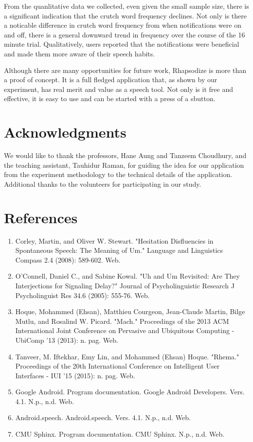\documentclass{sigchi}
\begin{document}
From the quanlitative data we collected, even given the small sample size, there is a significant indication that the crutch word frequency declines. Not only is there a noticable difference in crutch word frequency from when notifications were on and off, there is a general downward trend in frequency over the course of the 16 minute trial. Qualitatively, users reported that the notifications were beneficial and made them more aware of their speech habits. 

Although there are many opportunities for future work, Rhapsodize is more than a proof of concept. It is a full fledged application that, as shown by our experiment, has real merit and value as a speech tool. Not only is it free and effective, it is easy to use and can be started with a press of a sbutton. 

\section{Acknowledgments}

We would like to thank the professors, Hane Aung and Tanzeem Choudhury, and the teaching assistant, Tauhidur Raman, for guiding the idea for our application from the experiment methodology to the technical details of the application. Additional thanks to the volunteers for participating in our study. 

\section{References}

\begin{enumerate}
\item Corley, Martin, and Oliver W. Stewart. "Hesitation Disfluencies in Spontaneous Speech: The Meaning of Um." Language and Linguistics Compass 2.4 (2008): 589-602. Web.
\item O’Connell, Daniel C., and Sabine Kowal. "Uh and Um Revisited: Are They Interjections for Signaling Delay?" Journal of Psycholinguistic Research J Psycholinguist Res 34.6 (2005): 555-76. Web.
\item Hoque, Mohammed (Ehsan), Matthieu Courgeon, Jean-Claude Martin, Bilge Mutlu, and Rosalind W. Picard. "Mach." Proceedings of the 2013 ACM International Joint Conference on Pervasive and Ubiquitous Computing - UbiComp '13 (2013): n. pag. Web.
\item Tanveer, M. Iftekhar, Emy Lin, and Mohammed (Ehsan) Hoque. "Rhema." Proceedings of the 20th International Conference on Intelligent User Interfaces - IUI '15 (2015): n. pag. Web.
\item Google Android. Program documentation. Google Android Developers. Vers. 4.1. N.p., n.d. Web.
\item Android.speech. Android.speech. Vers. 4.1. N.p., n.d. Web.
\item CMU Sphinx. Program documentation. CMU Sphinx. N.p., n.d. Web.
\end{enumerate}
\end{document}
